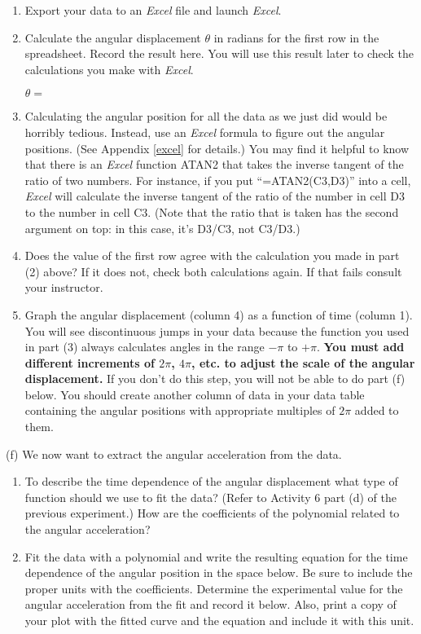 \begin{enumerate}
\item Export your data to an \textit{Excel} file and launch 
\textit{Excel}.

\item Calculate the angular displacement \( \theta  \) in radians for the first row
in the spreadsheet. Record the result here.
You will use this result later to check the calculations you make with 
\textit{Excel}.
\bigskip


$\theta =$
\bigskip

\item Calculating the angular position for all the data as we just did
would be horribly tedious. Instead, use an {\it Excel} formula to
figure out the angular positions.  (See Appendix \ref{excel} for details.)
You may find it helpful to know that there is an {\it Excel} function
ATAN2 that takes the inverse tangent of the ratio of two numbers.
For instance, if you put ``=ATAN2(C3,D3)'' into a cell, {\it Excel}
will calculate the inverse tangent of the ratio of the number
in cell D3 to the number in cell C3.  (Note that the ratio
that is taken has the second argument on top: in this case, it's 
D3/C3, not C3/D3.)

\item Does the value of the first row agree with the calculation you made in part
(2) above? If it does not, check both calculations again. If that fails consult
your instructor. 
\item Graph the angular displacement (column 4) as a function of time (column 1).
You will see discontinuous jumps in your data because the function you used
in part (3) always calculates angles in the range \( -\pi  \) to \( +\pi  \).
\textbf{You must add different increments of \( 2\pi  \), \(4 \pi  \), etc. to adjust
the scale of the angular displacement.} If you don't do this step, you will not be able to do part (f) below.  You should create another
column of data in your data table containing the angular positions with
appropriate multiples of $2\pi$ added to them.
\end{enumerate}
(f) We now want to extract the angular acceleration from the data.

\begin{enumerate}
\item To describe the time dependence of the angular displacement what type of 
function should we use to fit the data? (Refer to Activity 6 part (d) of the 
previous experiment.) How are the coefficients of the polynomial related to 
the angular acceleration?
\answerspace{30mm}


\pagebreak[2]
\item Fit the data with a polynomial and write the resulting equation for the 
time dependence of the angular position in the space below. Be sure to include 
the proper units with the coefficients. Determine the experimental value for the
angular acceleration from the fit and record it below. Also, print a copy of
your plot with the fitted curve and the equation and include it with this unit.
\vspace{50mm}

\end{enumerate}


